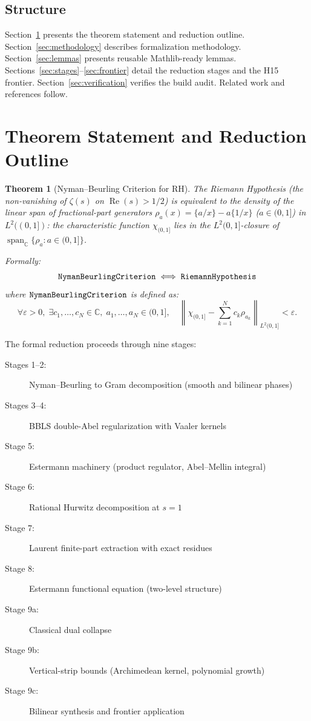 \documentclass[11pt,a4paper]{article}
\theoremstyle{plain}
\newtheorem{theorem}{Theorem}[section]
\theoremstyle{definition}
\theoremstyle{remark}
\newcommand{\eps}{\varepsilon}
\DeclareMathOperator{\RePart}{Re}
\renewcommand{\Re}{\RePart}
\begin{document}
\subsection{Structure}

Section~\ref{sec:theorem} presents the theorem statement and reduction outline. Section~\ref{sec:methodology} describes formalization methodology. Section~\ref{sec:lemmas} presents reusable Mathlib-ready lemmas. Sections~\ref{sec:stages}--\ref{sec:frontier} detail the reduction stages and the H15 frontier. Section~\ref{sec:verification} verifies the build audit. Related work and references follow.

\section{Theorem Statement and Reduction Outline}
\label{sec:theorem}

\begin{theorem}[Nyman--Beurling Criterion for RH]\label{thm:main}
The Riemann Hypothesis (the non-vanishing of $\zeta(s)$ on $\Re(s) > 1/2$) is equivalent to the density of the linear span of fractional-part generators $\rho_a(x) = \{a/x\} - a\{1/x\}$ ($a \in (0,1]$) in $L^2((0,1])$: the characteristic function $\chi_{(0,1]}$ lies in the $L^2(0,1]$-closure of $\operatorname{span}_{\mathbb{C}} \{\rho_a : a \in (0,1]\}$.

Formally:
\[
\text{\texttt{NymanBeurlingCriterion}} \iff \text{\texttt{RiemannHypothesis}}
\]
where $\text{\texttt{NymanBeurlingCriterion}}$ is defined as:
\[
\forall \eps > 0, \; \exists c_1, \dots, c_N \in \mathbb{C}, \; a_1, \dots, a_N \in (0,1], \quad \left\| \chi_{(0,1]} - \sum_{k=1}^N c_k \rho_{a_k} \right\|_{L^2(0,1]} < \eps.
\]
\end{theorem}

The formal reduction proceeds through nine stages:

\begin{description}
  \item[Stages 1--2:] Nyman--Beurling to Gram decomposition (smooth and bilinear phases)
  \item[Stages 3--4:] BBLS double-Abel regularization with Vaaler kernels
  \item[Stage 5:] Estermann machinery (product regulator, Abel--Mellin integral)
  \item[Stage 6:] Rational Hurwitz decomposition at $s=1$
  \item[Stage 7:] Laurent finite-part extraction with exact residues
  \item[Stage 8:] Estermann functional equation (two-level structure)
  \item[Stage 9a:] Classical dual collapse
  \item[Stage 9b:] Vertical-strip bounds (Archimedean kernel, polynomial growth)
  \item[Stage 9c:] Bilinear synthesis and frontier application
\end{description}
\end{document}
